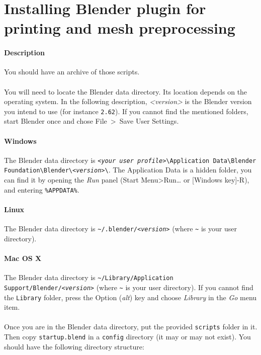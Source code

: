 \documentclass{article}
\begin{document}
\section{Installing Blender plugin for printing and mesh preprocessing}

	\paragraph{Description} You should have an archive of those scripts.

	\paragraph{}
	You will need to locate the Blender data directory. Its location depends on
	the operating system. In the following description, \emph{<version>} is the
	Blender version you intend to use (for instance \texttt{2.62}). If you cannot find the mentioned folders, start Blender once and chose File~>~Save User Settings.

	\paragraph{Windows} The Blender data directory is \texttt{\emph{<your user profile>}\textbackslash{}Application Data\textbackslash{}Blender Foundation\textbackslash{}Blender\textbackslash{}\emph{<version>}\textbackslash{}}. The Application Data is a hidden folder, you can find it by opening the \emph{Run} panel (Start Menu>Run… or [Windows key]-R), and entering \texttt{\%APPDATA\%}. 

	\paragraph{Linux} The Blender data directory is \texttt{\~ {}/.blender/\emph{<version>}} (where \texttt{\~{}} is your user directory).
	
	\paragraph{Mac OS X} The Blender data directory is \texttt{\~{}/Library/Application Support/Blender/\emph{<version>}} (where \texttt{\~{}} is your user directory). If you cannot find the \texttt{Library} folder, press the Option (\emph{alt}) key and choose \emph{Library} in the \emph{Go} menu item.
	
	\paragraph{} Once you are in the Blender data directory, put the provided \texttt{scripts} folder in it. Then copy \texttt{startup.blend} in a \texttt{config} directory (it may or may not exist). You should have the following directory structure:\\
\end{document}
